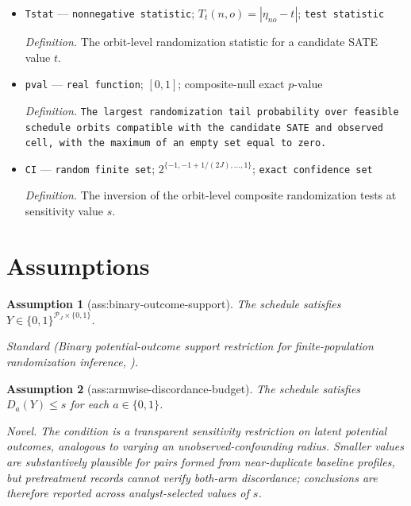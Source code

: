 \documentclass{article}
\newtheorem{assumption}{Assumption}
\begin{document}
\begin{itemize}
  \par\smallskip\noindent\emph{Definition.} \texttt{The observation-\allowbreak{}orbit index of labelled assignment and observed outcomes.}
  \item \texttt{Tstat} --- \texttt{nonnegative statistic}; \(T_t(n,o)=|\eta_{no}-t|\); \texttt{test statistic}
  \par\smallskip\noindent\emph{Definition.} The orbit-level randomization statistic for a candidate SATE value \(t\).
  \item \texttt{pval} --- \texttt{real function}; \([0,1]\); composite-null exact \(p\)-value
  \par\smallskip\noindent\emph{Definition.} \texttt{The largest randomization tail probability over feasible schedule orbits compatible with the candidate SATE and observed cell,\allowbreak{} with the maximum of an empty set equal to zero.}
  \item \texttt{CI} --- \texttt{random finite set}; \(2^{\{-1,-1+1/(2J),\ldots,1\}}\); \texttt{exact confidence set}
  \par\smallskip\noindent\emph{Definition.} The inversion of the orbit-level composite randomization tests at sensitivity value \(s\).
\end{itemize}

\section{Assumptions}

\begin{assumption}[ass:binary-outcome-support]\label{ass:binary-outcome-support}
The schedule satisfies \(Y\in\{0,1\}^{\mathcal P_J\times\{0,1\}}\).
\par\smallskip\noindent\emph{Standard} (Binary potential-outcome support restriction for finite-population randomization inference, \cite{Wilson2026MatchedBinary}).
\end{assumption}

\begin{assumption}[ass:armwise-discordance-budget]\label{ass:armwise-discordance-budget}
The schedule satisfies \(D_a(Y)\le s\) for each \(a\in\{0,1\}\).
\par\smallskip\noindent\emph{Novel.} The condition is a transparent sensitivity restriction on latent potential outcomes, analogous to varying an unobserved-confounding radius. Smaller values are substantively plausible for pairs formed from near-duplicate baseline profiles, but pretreatment records cannot verify both-arm discordance; conclusions are therefore reported across analyst-selected values of \(s\).
\end{assumption}
\end{document}
